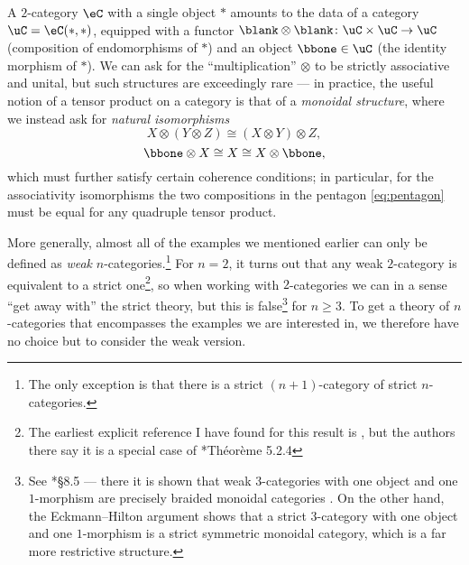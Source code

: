 \documentclass[a4paper,12pt]{article}
\begin{document}
\begin{ex}
  A $2$-category $\eC$ with a single object $*$ amounts to the data of a
  category $\uC = \eC(*, *)$, equipped with a functor
  $\blank\otimes\blank \colon \uC \times \uC \to \uC$ (composition of
  endomorphisms of $*$) and an object $\bbone \in \uC$ (the identity
  morphism of $*$). We can ask for the ``multiplication'' $\otimes$ to
  be strictly associative and unital, but such structures are
  exceedingly rare --- in practice, the useful notion of a tensor
  product on a category is that of a \emph{monoidal structure}, where
  we instead ask for \emph{natural isomorphisms}
  \[ X \otimes (Y \otimes Z) \cong (X \otimes Y) \otimes Z,\]
  \[ \bbone \otimes X \cong X \cong X \otimes \bbone,\] which must
  further satisfy certain coherence conditions; in particular, for the associativity
  isomorphisms 
  the two compositions in the pentagon
  \cref{eq:pentagon} must be equal for any quadruple tensor product.
\end{ex}
More generally, almost all of the examples we mentioned earlier can
only be defined as \emph{weak} $n$-categories.\footnote{The only
  exception is that there is a strict $(n+1)$-category of strict
  $n$-categories.} For $n=2$, it turns out that any weak $2$-category
is equivalent to a strict one\footnote{The earliest explicit reference
  I have found for this result is \cite{MacLanePare}, but the authors
  there say it is a special case of \cite{Ben68}*{Th\'eor\`eme
    5.2.4}}, so when working with $2$-categories we can in a sense
``get away with'' the strict theory, but this is false\footnote{See
  \cite{GordonPowerStreet}*{\S 8.5} --- there it is shown that weak
  $3$-categories with one object and one $1$-morphism are precisely
  braided monoidal categories \cite{JoyalStreet}. On the other hand,
  the Eckmann--Hilton argument shows that a strict $3$-category with
  one object and one $1$-morphism is a strict symmetric monoidal
  category, which is a far more restrictive structure.} for
$n \geq 3$. To get a theory of $n$-categories that encompasses the
examples we are interested in, we therefore have no choice but to
consider the weak version.
\end{document}
